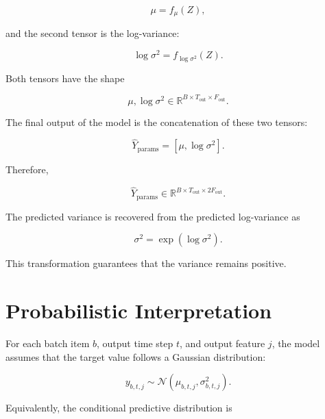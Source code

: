\documentclass[a4paper]{article}
\begin{document}
        \[
            \mu
            =
            f_{\mu}
            \left(
                Z
            \right),
        \]
        
        and the second tensor is the log-variance:
        
        \[
            \log \sigma^2
            =
            f_{\log \sigma^2}
            \left(
                Z
            \right).
        \]
        
        Both tensors have the shape
        
        \[
            \mu,
            \log \sigma^2
            \in
            \mathbb{R}^{B \times T_{\mathrm{out}} \times F_{\mathrm{out}}}.
        \]
        
        The final output of the model is the concatenation of these two tensors:
        
        \[
            \hat{Y}_{\mathrm{params}}
            =
            \left[
                \mu,
                \log \sigma^2
            \right].
        \]
        
        Therefore,
        
        \[
            \hat{Y}_{\mathrm{params}}
            \in
            \mathbb{R}^{B \times T_{\mathrm{out}} \times 2F_{\mathrm{out}}}.
        \]
        
        The predicted variance is recovered from the predicted log-variance as
        
        \[
            \sigma^2
            =
            \exp
            \left(
                \log \sigma^2
            \right).
        \]
        
        This transformation guarantees that the variance remains positive.
    
    
    \section{Probabilistic Interpretation}
        
        For each batch item \(b\), output time step \(t\), and output feature \(j\), the model assumes that the target value follows a Gaussian distribution:
        
        \[
            y_{b,t,j}
            \sim
            \mathcal{N}
            \left(
                \mu_{b,t,j},
                \sigma^2_{b,t,j}
            \right).
        \]
        
        Equivalently, the conditional predictive distribution is
        
\end{document}

